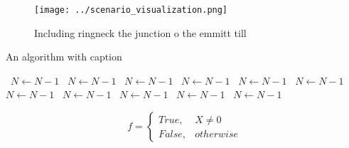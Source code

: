 \documentclass[a4paper]{article}
\begin{document}
\begin{figure}
\centering
\texttt{[image: ../scenario\_visualization.png]}
\caption{Including ringneck the junction o the emmitt till
}
\end{figure}
 
\begin{algorithm}
\caption{An algorithm with caption}
\begin{algorithmic}
\    \State $N \gets N - 1$
\    \State $N \gets N - 1$
\    \State $N \gets N - 1$
\    \State $N \gets N - 1$
\    \State $N \gets N - 1$
\    \State $N \gets N - 1$
\    \State $N \gets N - 1$
\    \State $N \gets N - 1$
\    \State $N \gets N - 1$
\    \State $N \gets N - 1$
\    \State $N \gets N - 1$
\EndWhile
\end{algorithmic}
\end{algorithm}

\begin{equation}   f =
\begin{cases} True, & X \neq 0\\
False, & otherwise
\end{cases}
\end{equation}
\end{document}

